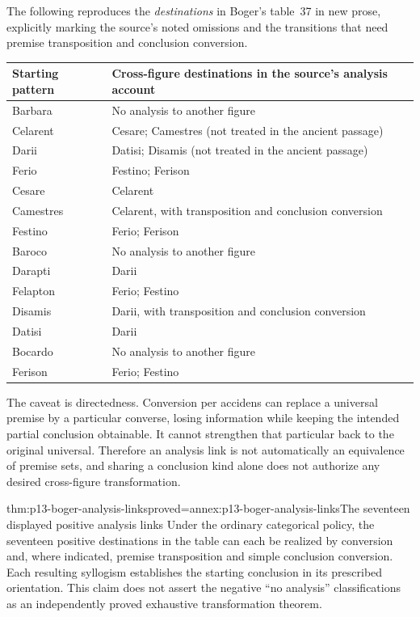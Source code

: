 The following reproduces the \emph{destinations} in Boger's table~37 in new
prose, explicitly marking the source's noted omissions and the transitions
that need premise transposition and conclusion conversion.

\begin{tabularx}{\textwidth}{@{}l X@{}}
\toprule
Starting pattern & Cross-figure destinations in the source's analysis account\\
\midrule
Barbara & No analysis to another figure\\
Celarent & Cesare; Camestres (not treated in the ancient passage)\\
Darii & Datisi; Disamis (not treated in the ancient passage)\\
Ferio & Festino; Ferison\\
Cesare & Celarent\\
Camestres & Celarent, with transposition and conclusion conversion\\
Festino & Ferio; Ferison\\
Baroco & No analysis to another figure\\
Darapti & Darii\\
Felapton & Ferio; Festino\\
Disamis & Darii, with transposition and conclusion conversion\\
Datisi & Darii\\
Bocardo & No analysis to another figure\\
Ferison & Ferio; Festino\\
\bottomrule
\end{tabularx}

The caveat is directedness. Conversion per accidens can replace a universal
premise by a particular converse, losing information while keeping the
intended partial conclusion obtainable. It cannot strengthen that particular
back to the original universal. Therefore an analysis link is not automatically
an equivalence of premise sets, and sharing a conclusion kind alone does not
authorize any desired cross-figure transformation.

\begin{hbtheorem}{thm:p13-boger-analysis-links}{proved=annex:p13-boger-analysis-links}{The seventeen displayed positive analysis links}
Under the ordinary categorical policy, the seventeen positive destinations
in the table can each be realized by conversion and, where indicated,
premise transposition and simple conclusion conversion. Each resulting
syllogism establishes the starting conclusion in its prescribed orientation.
This claim does not assert the negative ``no analysis'' classifications as
an independently proved exhaustive transformation theorem.
\end{hbtheorem}

